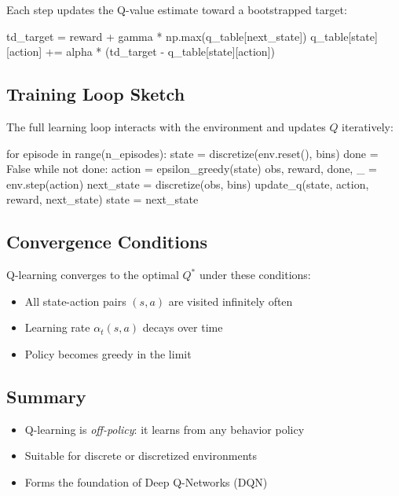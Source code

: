 \documentclass{article}
\begin{document}
Each step updates the Q-value estimate toward a bootstrapped target:

\begin{python}
td_target = reward + gamma * np.max(q_table[next_state])
q_table[state][action] += alpha * (td_target - q_table[state][action])
\end{python}

\subsection{Training Loop Sketch}

The full learning loop interacts with the environment and updates $Q$ iteratively:

\begin{python}
for episode in range(n_episodes):
    state = discretize(env.reset(), bins)
    done = False
    while not done:
        action = epsilon_greedy(state)
        obs, reward, done, _ = env.step(action)
        next_state = discretize(obs, bins)
        update_q(state, action, reward, next_state)
        state = next_state
\end{python}

\subsection{Convergence Conditions}

Q-learning converges to the optimal $Q^*$ under these conditions:
\begin{itemize}
    \item All state-action pairs $(s,a)$ are visited infinitely often
    \item Learning rate $\alpha_t(s,a)$ decays over time
    \item Policy becomes greedy in the limit
\end{itemize}

\subsection{Summary}

\begin{itemize}
    \item Q-learning is \emph{off-policy}: it learns from any behavior policy
    \item Suitable for discrete or discretized environments
    \item Forms the foundation of Deep Q-Networks (DQN)
\end{itemize}
\end{document}
